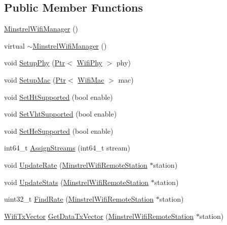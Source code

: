 \subsection*{Public Member Functions}
\begin{DoxyCompactItemize}
\item 
\hyperlink{classns3_1_1MinstrelWifiManager_aabb10b7ccc2f7298fe491b00880954f4}{Minstrel\+Wifi\+Manager} ()
\item 
virtual \hyperlink{classns3_1_1MinstrelWifiManager_a5da5b1d27a5ed91ae06490360c0932a1}{$\sim$\+Minstrel\+Wifi\+Manager} ()
\item 
void \hyperlink{classns3_1_1MinstrelWifiManager_a0a2d2aaf96c2e8e07e4833dbc3e52fa0}{Setup\+Phy} (\hyperlink{classns3_1_1Ptr}{Ptr}$<$ \hyperlink{classns3_1_1WifiPhy}{Wifi\+Phy} $>$ phy)
\item 
void \hyperlink{classns3_1_1MinstrelWifiManager_a739a54f771a5dcc9b52b8b66346280ad}{Setup\+Mac} (\hyperlink{classns3_1_1Ptr}{Ptr}$<$ \hyperlink{classns3_1_1WifiMac}{Wifi\+Mac} $>$ mac)
\item 
void \hyperlink{classns3_1_1MinstrelWifiManager_a19dcde28785f3ceddb317bfb77adc861}{Set\+Ht\+Supported} (bool enable)
\item 
void \hyperlink{classns3_1_1MinstrelWifiManager_aa6111fd646d8a703510e771bc9befe6b}{Set\+Vht\+Supported} (bool enable)
\item 
void \hyperlink{classns3_1_1MinstrelWifiManager_a0c96447be5c42b8970702e669026c17d}{Set\+He\+Supported} (bool enable)
\item 
int64\+\_\+t \hyperlink{classns3_1_1MinstrelWifiManager_ac08c92ef99479ba0547a6ad7596f3a61}{Assign\+Streams} (int64\+\_\+t stream)
\item 
void \hyperlink{classns3_1_1MinstrelWifiManager_ac77228ed9059e348e18e230835c64dad}{Update\+Rate} (\hyperlink{structns3_1_1MinstrelWifiRemoteStation}{Minstrel\+Wifi\+Remote\+Station} $\ast$station)
\item 
void \hyperlink{classns3_1_1MinstrelWifiManager_a5702af5353375bbb7099b41b76fc7c21}{Update\+Stats} (\hyperlink{structns3_1_1MinstrelWifiRemoteStation}{Minstrel\+Wifi\+Remote\+Station} $\ast$station)
\item 
uint32\+\_\+t \hyperlink{classns3_1_1MinstrelWifiManager_ac1a095648370f1330715968da032b139}{Find\+Rate} (\hyperlink{structns3_1_1MinstrelWifiRemoteStation}{Minstrel\+Wifi\+Remote\+Station} $\ast$station)
\item 
\hyperlink{classns3_1_1WifiTxVector}{Wifi\+Tx\+Vector} \hyperlink{classns3_1_1MinstrelWifiManager_afc42d002709fb4334ae5b164bfa07aa8}{Get\+Data\+Tx\+Vector} (\hyperlink{structns3_1_1MinstrelWifiRemoteStation}{Minstrel\+Wifi\+Remote\+Station} $\ast$station)

\end{DoxyCompactItemize}
